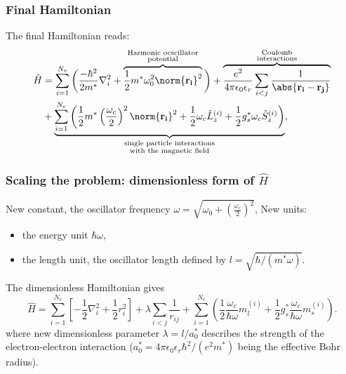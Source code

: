 \documentclass[xcolor=pdftex,hyperref={pdfpagelabels=false},table]{beamer}
\begin{document}
\begin{frame}
\frametitle{Final Hamiltonian}
\begin{small}
The final Hamiltonian reads:
\begin{align}
  \hat{H}&=\sum_{i=1}^{N_e} \bigg(  \frac{- \hbar^2}{2m^*} \nabla_i^2 + \overbrace{\frac{1}{2} m^* \omega_0^2 \norm{\mathbf{r_i}}^2}^{\begin{smallmatrix}
  \text{Harmonic ocscillator} \\
  \text{potential}
\end{smallmatrix}} \bigg) + \overbrace{\frac{e^2}{4 \pi \epsilon_0 \epsilon_r} \sum_{i<j}\frac{1}{\abs{\mathbf{r_i}-\mathbf{r_j}}}}^{\begin{smallmatrix}
  \text{Coulomb} \\
  \text{interactions}
\end{smallmatrix}}  \nonumber \\
& + \underbrace{\sum_{i=1}^{N_e} \left( \frac{1}{2} m^* \left( \frac{\omega_c}{2} \right)^2 \norm{\mathbf{r_i}}^2 + \frac{1}{2}  \omega_c \hat{L}_z^{(i)}+ \frac{1  }{2} g_s^*  \omega_c \hat{S}_z^{(i)}\right)}_{\begin{smallmatrix}
  \text{single particle interactions} \\
  \text{with the magnetic field}
\end{smallmatrix}},
\end{align}
\end{small}
\end{frame}


\begin{frame}
\frametitle{Scaling the problem: dimensionless form of $\hat{H}$}
\begin{footnotesize}
New constant, the oscillator frequency $\omega = \sqrt{\omega_0+\left( \frac{\omega_c}{2} \right)^2}$, \newline
New units:
\begin{itemize}
\item the energy unit $\hbar \omega$,
\item 	the length unit, the oscillator length defined by $l=\sqrt{\hbar /(m^* \omega)}$.
\end{itemize}
The dimensionless Hamiltonian gives
\begin{equation}
  \hat{H}=\sum_{i=1}^{N_e} \left[  -\frac{1}{2} \nabla_i^2 + \frac{1}{2} r_i^2  \right]+ \lambda \sum_{i<j}\frac{1}{r_{ij}} +  \sum_{i=1}^{N_e} \left(  \frac{1}{2}  \frac{\omega_c}{\hbar \omega} m_l^{(i)}+ \frac{1  }{2} g_s^* \frac{\omega_c}{\hbar \omega} m_s^{(i)}\right).
\end{equation}
where new dimensionless parameter $\lambda=l / a_0^*$ describes the strength of the electron-electron interaction ($a_0^*= 4 \pi \epsilon_0 \epsilon_r \hbar^2 / (e^2 m^*)$ being the effective Bohr radius).
\end{footnotesize}
\end{frame}
\end{document}
